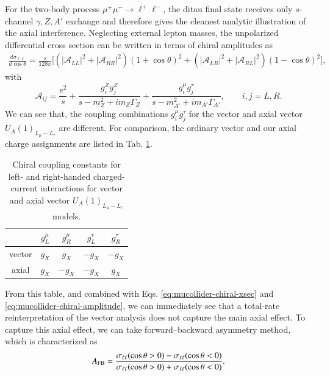 \documentclass[onecolumn, aps, nofootinbib, prd, preprint, floats, floatfix, amsmath, amssymb, superscriptaddress, preprintnumbers]{revtex4-2}
\begin{document}
For the two-body process $\mu^+\mu^-\to\ell^+\ell^-$, the ditau final state receives only $s$-channel $\gamma,Z,A'$ exchange and therefore gives the cleanest analytic illustration of the axial interference. 
Neglecting external lepton masses, the unpolarized differential cross section can be written in terms of chiral amplitudes as
\begin{align}
\frac{d\sigma_{\ell\ell}}{d\cos\theta}=
\frac{s}{128\pi}
\bigg[ \left(|\mathcal A_{LL}|^2+|\mathcal A_{RR}|^2\right)(1+\cos\theta)^2 + \left(|\mathcal A_{LR}|^2+|\mathcal A_{RL}|^2\right)(1-\cos\theta)^2 \bigg],
\label{eq:mucollider-chiral-xsec}
\end{align}
with
\begin{equation}
\mathcal A_{ij}
=\frac{e^2}{s}+\frac{g_i^Z g_j^Z}{s-m_Z^2+i m_Z\Gamma_Z}+\frac{g_i^\mu g_j^\tau}{s-m_{A'}^2+i m_{A'}\Gamma_{A'}},
\qquad i,j=L,R .
\label{eq:mucollider-chiral-amplitude}
\end{equation}
We can see that, the coupling combinations $g_i^\mu g_j^\tau$ for the vector and axial vector $U_A(1)_{L_\mu-L_\tau}$ are different. For comparison, the ordinary vector and our axial charge assignments are listed in Tab. \ref{tab:vector-axial-charges}. 
\begin{table}[htbp]
    \centering
    \begin{tabular}{c|cccc}
    \hline
     & $g_L^\mu$ & $g_R^\mu$ & $g_L^\tau$ & $g_R^\tau$ \\
    \hline
    vector & $g_X$ & $g_X$ & $-g_X$ & $-g_X$ \\
    axial & $g_X$ & $-g_X$ & $-g_X$ & $g_X$ \\
    \hline
    \end{tabular}
    \caption{Chiral coupling constants for left- and right-handed charged-current interactions for vector and axial vector $U_A(1)_{L_\mu-L_\tau}$ models.}
    \label{tab:vector-axial-charges}
\end{table}
From this table, and combined with Eqs. \eqref{eq:mucollider-chiral-xsec} and \eqref{eq:mucollider-chiral-amplitude}, we can immediately see that a total-rate reinterpretation of the vector analysis does not capture the main axial effect. To capture this axial effect, we can take forward–backward asymmetry method, which is characterized as
\begin{equation}
A_{\rm FB}=
\frac{\sigma_{\ell\ell}(\cos\theta>0)-\sigma_{\ell\ell}(\cos\theta<0)}
{\sigma_{\ell\ell}(\cos\theta>0)+\sigma_{\ell\ell}(\cos\theta<0)}.
\label{eq:mucollider-afb}
\end{equation}
\end{document}
